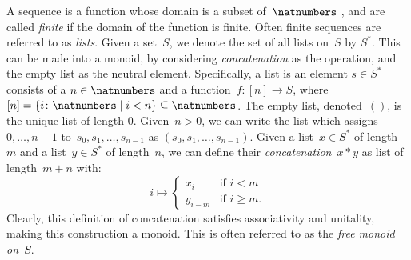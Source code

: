\begin{example}[Sequences]
  A sequence is a function whose domain is a subset of~$\natnumbers$ , and are called \emph{finite} if the domain of the function is finite. Often finite sequences are referred to as \emph{lists}. Given a set~$S$, we denote the set of all lists on~$S$ by $S^\ast$. This can be made into a monoid, by considering \emph{concatenation} as the operation, and the empty list as the neutral element. Specifically, a list is an element $s\in S^\ast$ consists of a $n\in \natnumbers$ and a function~$f\colon [n]\to S$, where~$[n]=\{i\colon \natnumbers\mid i<n\}\subseteq \natnumbers$. The empty list, denoted~$()$, is the unique list of length 0. Given~$n>0$, we can write the list which assigns~$0,\ldots,n-1$ to~$s_0,s_1,\ldots,s_{n-1}$ as $(s_0,s_1,\ldots,s_{n-1})$. Given a list~$x\in S^\ast$ of length~$m$ and a list~$y\in S^\ast$ of length~$n$, we can define their \emph{concatenation}~$x*y$ as list of length~$m+n$ with:
  \begin{equation*}
    i\mapsto
    \begin{cases}
      x_i&\text{if }i<m\\
      y_{i-m}&\text{if }i\geq m.
    \end{cases}
  \end{equation*}
  Clearly, this definition of concatenation satisfies associativity and unitality, making this construction a monoid. This is often referred to as the \emph{free monoid on~$S$}.
\end{example}


